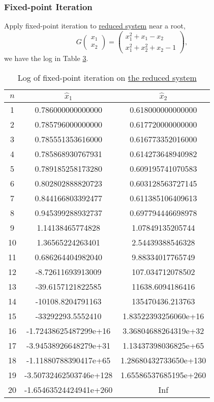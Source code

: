 \begin{table}[H]
\subsubsection{Fixed-point Iteration}
Apply fixed-point iteration to \hyperref[eqn1reduce]{reduced system} near a root,
\[ G\begin{pmatrix} x_1\\ x_2\end{pmatrix}=\begin{pmatrix} x_1^2+x_1-x_2 \\ x_1^2+x_2^2+x_2-1 \end{pmatrix}, \]
we have the log in Table \ref{logeqn1fp}.
\ifnum{}
	\begin{table}[H]
\else
	\begin{table}[htbp]
\fi
	\centering
	\begin{tabular}{|c|c|c|}
	\hline
	\(n\)	&	\(\hat{x}_1\)	&	\(\hat{x}_2\)	\\	\hline
	1	&	0.786000000000000		&	0.618000000000000		\\	\hline
	2	&	0.785796000000000		&	0.617720000000000		\\	\hline
	3	&	0.785551353616000		&	0.616773352016000		\\	\hline
	4	&	0.785868930767931		&	0.614273648940982		\\	\hline
	5	&	0.789185258173280		&	0.609195741070583		\\	\hline
	6	&	0.802802888820723		&	0.603128563727145		\\	\hline
	7	&	0.844166803392477		&	0.611385106409613		\\	\hline
	8	&	0.945399288932737		&	0.697794446698978		\\	\hline
	9	&	1.14138465774828		&	1.07849135205744		\\	\hline
	10	&	1.36565224263401		&	2.54439388546328		\\	\hline
	11	&	0.686264404982040		&	9.88334017765749		\\	\hline
	12	&	-8.72611693913009		&	107.034712078502		\\	\hline
	13	&	-39.6157121822585		&	11638.6094186416		\\	\hline
	14	&	-10108.8204791163		&	135470436.213763		\\	\hline
	15	&	-33292293.5552410		&	1.83522393256060e+16	\\	\hline
	16	&	-1.72438625487299e+16	&	3.36804688264319e+32	\\	\hline
	17	&	-3.94538926648279e+31	&	1.13437398036825e+65	\\	\hline
	18	&	-1.11880788390417e+65	&	1.28680432733650e+130	\\	\hline
	19	&	-3.50732462503746e+128	&	1.65586537685195e+260	\\	\hline
	20	&	-1.65463524424941e+260	&	Inf						\\	\hline
	\end{tabular}
	\caption{Log of fixed-point iteration on \hyperref[eqn1reduce]{the reduced system}}
	\label{logeqn1fp}
	\end{table}


\end{table}
\end{table}
